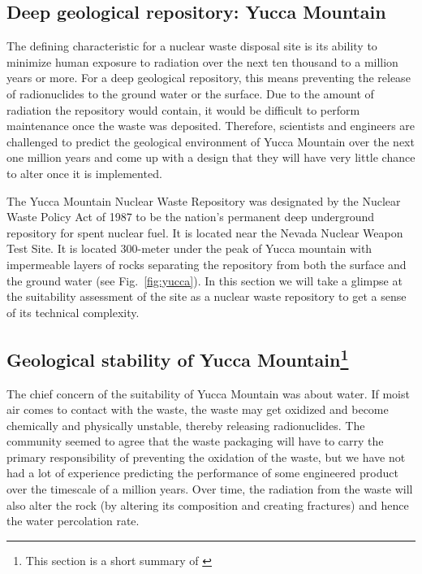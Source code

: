 \documentclass[nofootinbib,preprint,aps]{revtex4-1}
\begin{document}
    \subsection{Deep geological repository: Yucca Mountain}
        The defining characteristic for a nuclear waste disposal site is its ability to minimize human
        exposure to radiation over the next ten thousand to a million years or more.
        For a deep geological repository, this means preventing the release
        of radionuclides to the ground water or the surface.
        Due to the amount of radiation the repository would contain, it would be difficult to perform
        maintenance once the waste was deposited. Therefore, scientists and engineers are challenged
        to predict the geological environment of Yucca Mountain over the next one million years and come up
        with a design that they will have very little chance to alter once it is implemented.

        The Yucca Mountain Nuclear Waste Repository was designated by the Nuclear Waste Policy Act
        of 1987 to be the nation's permanent deep underground repository for spent nuclear fuel. It is
        located near the Nevada Nuclear Weapon Test Site.
        It is located 300-meter under the peak of Yucca mountain with impermeable layers of rocks
        separating the repository
        from both the surface and the ground water (see Fig.~\ref{fig:yucca}).
        In this section we will take a glimpse at the suitability assessment of the site
        as a nuclear waste repository to get a sense of its technical complexity.


        \subsection{Geological stability of Yucca Mountain\footnote{This section is a short summary of \cite{m06}}}
        The chief concern of the suitability of Yucca Mountain was about water. If moist air comes to
        contact with the waste, the waste may get oxidized and become chemically and physically unstable, thereby
        releasing radionuclides.
        The community seemed to agree that the waste packaging will have to carry the primary
        responsibility of preventing the oxidation of the waste, but we have not had a lot of experience
        predicting the performance of some
        engineered product over the timescale of a million years.
        Over time, the radiation from the waste will also alter the rock (by altering its composition
        and creating fractures) and hence the water percolation rate.
\end{document}
